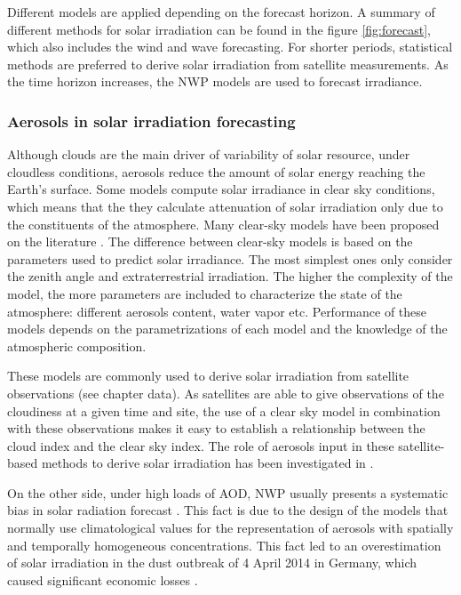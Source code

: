\begin{itemize}
Different models are applied depending on the forecast horizon. A summary of different methods for solar irradiation can be found in the figure \ref{fig:forecast}, which also includes the wind and wave forecasting. For shorter periods, statistical methods are preferred to derive solar irradiation from satellite measurements. As the time horizon increases, the NWP models are used to forecast irradiance.


\end{itemize}

\subsubsection{Aerosols in solar irradiation forecasting}

Although clouds are the main driver of variability of solar resource, under cloudless conditions, aerosols reduce the amount of solar energy reaching the Earth's surface. Some models compute solar irradiance in clear sky conditions, which means that the they calculate attenuation of solar irradiation only due to the constituents of the atmosphere. Many clear-sky models have been proposed on the literature \cite*{Gueymard2012}. The difference between clear-sky models is based on the parameters used to predict solar irradiance. The most simplest ones only consider the zenith angle and extraterrestrial irradiation. The higher the complexity of the model, the more parameters are included to characterize the state of the atmosphere: different aerosols content, water vapor etc. Performance of these models depends on the parametrizations of each model and the knowledge of the atmospheric composition.
 
These models are commonly used to derive solar irradiation from satellite observations (see chapter data). As satellites are able to give observations of the cloudiness at a given time and site, the use of a clear sky model in combination with these observations makes it easy to establish a relationship between the cloud index and the clear sky index. The role of aerosols input in these satellite-based methods to derive solar irradiation has been investigated in \cite*{Polo2014}. 

On the other side, under high loads of AOD, NWP usually presents a systematic bias in solar radiation forecast \cite*{Rieger2017}. This fact is due to the design of the models that normally use climatological values for the representation of aerosols with spatially and temporally homogeneous concentrations. This fact led to an overestimation of solar irradiation in the dust outbreak of 4 April 2014 in Germany, which caused significant economic losses \cite{Rieger2017}.

